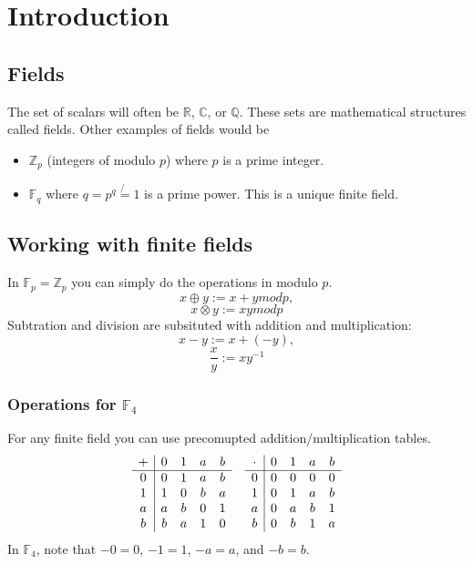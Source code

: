 \documentclass[12pt]{article}
\begin{document}

\tableofcontents
\pagebreak

\section{Introduction}
	\subsection{Fields}
	The set of scalars will often be $\mathbb{R}$, $\mathbb{C}$, or $\mathbb{Q}$. These sets are mathematical structures called fields. Other examples of fields would be
	\begin{itemize}
		\item $\mathbb{Z}_p$ (integers of modulo $p$) where $p$ is a prime integer.
		\item $\mathbb{F}_q$ where $q = p^q \not{=} 1$ is a prime power. This is a unique finite field.
	\end{itemize}
	
	\subsection{Working with finite fields}
	In $\mathbb{F}_p = \mathbb{Z}_p$ you can simply do the operations in modulo $p$.
	\[
		x \oplus y := x + y mod p,
	\]
	\[
		x \otimes y := xy mod p
	\]
	Subtration and division are subsituted with addition and multiplication:
	\[
		x - y := x + (-y),
	\]
	\[
		\frac{x}{y} := xy^{-1}
	\]
	
	\subsubsection{Operations for $\mathbb{F}_4$}
	For any finite field you can use precomupted addition/multiplication tables.
	\[
		\begin{array}{c | c c c c}
			+ & 0 & 1 & a & b \\
			\hline
			0 & 0 & 1 & a & b \\
			1 & 1 & 0 & b & a \\ 
			a & a & b & 0 & 1 \\
			b & b & a & 1 & 0
		\end{array}
		\quad
		\begin{array}{c|cccc}
			\cdot & 0 & 1 & a & b \\
			\hline
			0 & 0 & 0 & 0 & 0 \\
			1 & 0 & 1 & a & b \\
			a & 0 & a & b & 1 \\
			b & 0 & b & 1 & a
		\end{array}
	\]
	In $\mathbb{F}_4$, note that $-0 = 0$, $-1 = 1$, $-a = a$, and $-b = b$.
\end{document}
